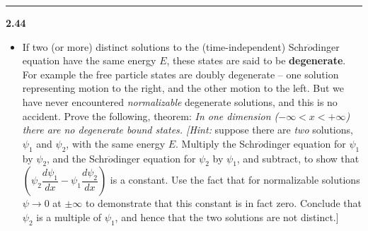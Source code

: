 \documentclass[fleqn]{article}
\begin{document}
\begin{itemize}
  \end{itemize}

  \rule{15cm}{1pt}

  \textbf{2.44}
  \begin{itemize}
    \item If two (or more) distinct solutions to the (time-independent) Schr$\ddot{o}$dinger equation have the
    same energy $E$, these states are said to be \textbf{degenerate}. For example the free particle states are 
    doubly degenerate -- one solution representing motion to the right, and the other motion to the left. But
    we have never encountered \emph{normalizable} degenerate solutions, and this is no accident. Prove the following,
    theorem: \emph{In one dimension ($-\infty < x < +\infty$) there are no degenerate bound states. [Hint:} suppose
    there are \emph{two} solutions, $\psi_1$ and $\psi_2$, with the same energy $E$. Multiply the Schr$\ddot{o}$dinger equation
    for $\psi_1$ by $\psi_2$, and the Schr$\ddot{o}$dinger equation for $\psi_2$ by $\psi_1$, and subtract,
    to show that $\left(\psi_2 \dfrac{d\psi_1}{dx}-\psi_1 \dfrac{d\psi_2}{dx}\right)$ is a constant. Use the 
    fact that for normalizable solutions $\psi \longrightarrow 0$ at $\pm \infty$ to demonstrate that this constant
    is in fact zero. Conclude that $\psi_2$ is a multiple of $\psi_1$, and hence that the two solutions
    are not distinct.]


\end{itemize}
\end{document}
